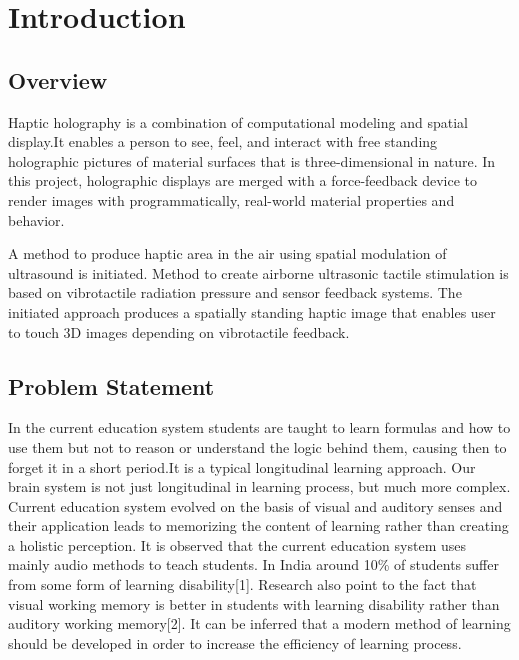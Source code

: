 \documentclass{fisatproject}
\begin{document}
\cleardoublepage
{}
\listoftables
\newpage



\chapter{Introduction}
\setcounter{page}{1}
\renewcommand{\baselinestretch}{1.50}
\section{Overview}
\par Haptic holography is a combination of computational modeling and spatial display.It enables a person to see, feel, and interact with free standing holographic pictures of material surfaces that is three-dimensional in nature. In this project, holographic displays are merged with a force-feedback device to render images with programmatically, real-world  material properties and behavior.

\par A method to produce haptic area in the air using spatial modulation of ultrasound is initiated. Method to create airborne ultrasonic tactile stimulation is based on vibrotactile radiation pressure and sensor feedback systems. The initiated approach produces a spatially standing haptic image that enables user to touch 3D images  depending on vibrotactile feedback.


\section{Problem Statement}

\par In the current education system students are taught to learn formulas and how to use them but not to reason or understand the logic behind them, causing then to forget it in a short period.It is a typical longitudinal learning approach. Our brain system is not just longitudinal in learning process, but much more complex. Current education system evolved on the basis of visual and auditory senses and their application leads to memorizing the content of learning rather than creating a holistic perception.
It is observed that the current education system  uses mainly audio methods to teach students.
In India around 10\% of students suffer from some form of learning disability[1]. Research also point to the fact that visual working memory is better in students with learning disability rather than auditory working memory[2].
It can be inferred that a modern method of learning should be developed in order to increase the efficiency of learning process.
\end{document}
